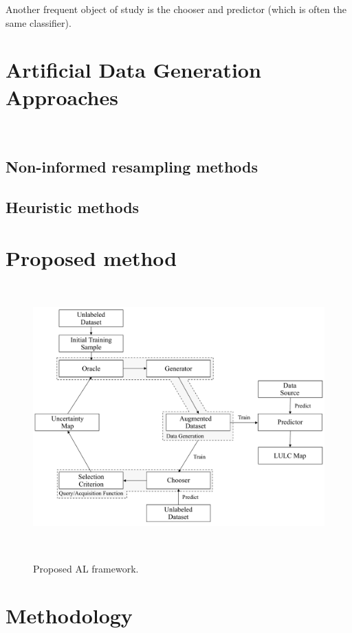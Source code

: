 \documentclass[parskip=full]{scrartcl}
\begin{document}
Another frequent object of study is the chooser and predictor (which is often the same classifier).





\section{Artificial Data Generation Approaches}~\label{sec:ovs-sota}

\subsection{Non-informed resampling methods}

\subsection{Heuristic methods}

\section{Proposed method}~\label{sec:proposed-method}

\begin{figure}[H]
	\centering
	\includegraphics[width=.85\linewidth]{../analysis/al_new}
	\caption{Proposed AL framework.
    }~\label{fig:al_new}
\end{figure}

\section{Methodology}~\label{sec:methodology}
\end{document}
